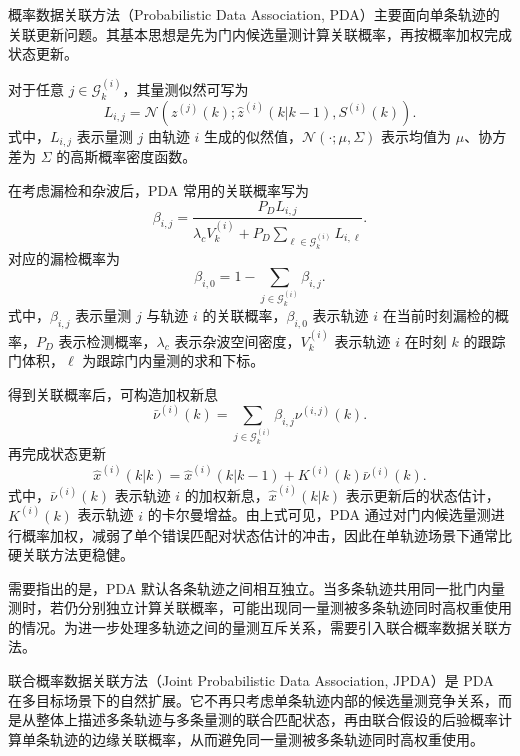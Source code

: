 \documentclass{xdupgthesis}
\begin{document}
概率数据关联方法（Probabilistic Data Association, PDA）主要面向单条轨迹的关联更新问题。其基本思想是先为门内候选量测计算关联概率，再按概率加权完成状态更新\cite{barshalom1975pda,chen2018weightedpda}。

对于任意 $j\in\mathcal{G}^{(i)}_k$，其量测似然可写为
\begin{equation}
	L_{i,j}
	=
	\mathcal{N}
	\left(
	z^{(j)}(k);
	\hat{z}^{(i)}(k|k-1),
	S^{(i)}(k)
	\right).
\end{equation}
式中，$L_{i,j}$ 表示量测 $j$ 由轨迹 $i$ 生成的似然值，$\mathcal{N}(\cdot;\mu,\Sigma)$ 表示均值为 $\mu$、协方差为 $\Sigma$ 的高斯概率密度函数。

在考虑漏检和杂波后，PDA 常用的关联概率写为
\begin{equation}
	\beta_{i,j}
	=
	\frac{P_D L_{i,j}}
	{\lambda_c V_k^{(i)}+P_D\sum\limits_{\ell\in\mathcal{G}^{(i)}_k}L_{i,\ell}}.
\end{equation}
对应的漏检概率为
\begin{equation}
	\beta_{i,0}
	=
	1-\sum_{j\in\mathcal{G}^{(i)}_k}\beta_{i,j}.
\end{equation}
式中，$\beta_{i,j}$ 表示量测 $j$ 与轨迹 $i$ 的关联概率，$\beta_{i,0}$ 表示轨迹 $i$ 在当前时刻漏检的概率，$P_D$ 表示检测概率，$\lambda_c$ 表示杂波空间密度，$V_k^{(i)}$ 表示轨迹 $i$ 在时刻 $k$ 的跟踪门体积，$\ell$ 为跟踪门内量测的求和下标。

得到关联概率后，可构造加权新息
\begin{equation}
	\bar{\nu}^{(i)}(k)
	=
	\sum_{j\in\mathcal{G}^{(i)}_k}
	\beta_{i,j}\nu^{(i,j)}(k).
\end{equation}
再完成状态更新
\begin{equation}
	\hat{x}^{(i)}(k|k)
	=
	\hat{x}^{(i)}(k|k-1)
	+
	K^{(i)}(k)\bar{\nu}^{(i)}(k).
\end{equation}
式中，$\bar{\nu}^{(i)}(k)$ 表示轨迹 $i$ 的加权新息，$\hat{x}^{(i)}(k|k)$ 表示更新后的状态估计，$K^{(i)}(k)$ 表示轨迹 $i$ 的卡尔曼增益。由上式可见，PDA 通过对门内候选量测进行概率加权，减弱了单个错误匹配对状态估计的冲击，因此在单轨迹场景下通常比硬关联方法更稳健。

需要指出的是，PDA 默认各条轨迹之间相互独立。当多条轨迹共用同一批门内量测时，若仍分别独立计算关联概率，可能出现同一量测被多条轨迹同时高权重使用的情况。为进一步处理多轨迹之间的量测互斥关系，需要引入联合概率数据关联方法。


联合概率数据关联方法（Joint Probabilistic Data Association, JPDA）是 PDA 在多目标场景下的自然扩展。它不再只考虑单条轨迹内部的候选量测竞争关系，而是从整体上描述多条轨迹与多条量测的联合匹配状态，再由联合假设的后验概率计算单条轨迹的边缘关联概率，从而避免同一量测被多条轨迹同时高权重使用\cite{fortmann1983jpda,cheng1998fastjpda}。
\end{document}
